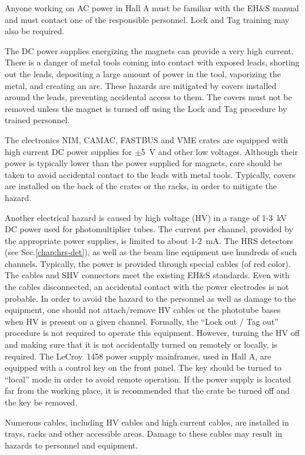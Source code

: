  Anyone working on AC power in Hall A must be familiar with the EH\&S\cite{EHScebaf} manual 
 and must contact one of the responsible personnel. Lock and Tag training may also be required.

 The DC power supplies energizing the magnets can provide a very high current.
 There is a danger of metal tools coming into contact with exposed leads, shorting out the
 leads, depositing a large amount of power in the tool, vaporizing the metal, and creating an arc.
 These hazards are mitigated by covers installed around the leads,
 preventing accidental access to them. The covers must not be removed
 unless the magnet is turned off using the Lock and Tag procedure by trained
 personnel. 

 The electronics NIM, CAMAC, FASTBUS and VME crates are equipped with high current
 DC power supplies for $\pm$5~V and other low voltages. Although their power 
 is typically lower than the power supplied for magnets,
 care should be taken to avoid accidental contact to the leads with metal tools.
 Typically, covers are installed on the back of the crates or the racks,
 in order to mitigate the hazard. 

 Another electrical hazard is caused by high voltage (HV) in a range of 1-3~kV  DC power used 
 for photomultiplier tubes. The current per channel, provided by the appropriate power supplies,
 is limited to about 1-2~mA. 
 The HRS detectors 
 (see Sec.\ref{chap:hrs-det}), as well as the beam line equipment use 
 hundreds of such channels. 
 Typically, the power is provided through special cables (of red color). The cables and SHV connectors 
 meet the existing EH\&S standards. Even with the cables disconnected, an accidental
 contact with the power electrodes is not probable. In order to avoid the hazard to the personnel
 as well as damage to the equipment, one should not attach/remove HV cables or the
 phototube bases when HV is present on a given channel. Formally, the ``Lock out / Tag out'' 
 procedure is not required to operate this equipment. However, turning the HV off
 and making sure that it is not accidentally turned on remotely or locally, is required.
 The LeCroy~1458 power supply mainframes, used in Hall A, are equipped with
 a control key on the front panel. The key should be turned to ``local'' mode in order to
 avoid remote operation. If the power supply is located far from the working place,
 it is recommended that the crate be turned off and the key be removed.
 
 Numerous cables, including HV cables and high current cables, are installed in trays, 
 racks and other accessible areas. Damage to these cables may result
 in hazards to personnel and equipment. 

